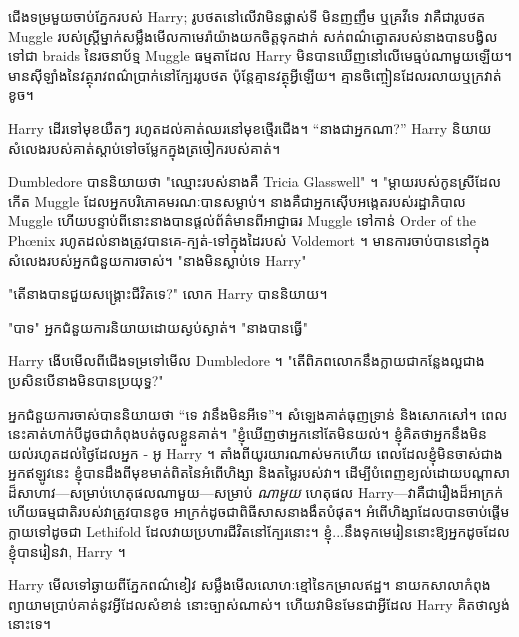 {ជើង​ទម្រ​មួយ​ចាប់​ភ្នែក​របស់ Harry; រូបថតនៅលើវាមិនផ្លាស់ទី មិនញញឹម ឬគ្រវីទេ វាគឺជារូបថត Muggle របស់ស្ត្រីម្នាក់សម្លឹងមើលកាមេរ៉ាយ៉ាងយកចិត្តទុកដាក់ សក់ពណ៌ត្នោតរបស់នាងបានបង្វិលទៅជា braids នៃរចនាប័ទ្ម Muggle ធម្មតាដែល Harry មិនបានឃើញនៅលើមេធ្មប់ណាមួយឡើយ។ មានស៊ីឡាំងនៃវត្ថុរាវពណ៌ប្រាក់នៅក្បែររូបថត ប៉ុន្តែគ្មានវត្ថុអ្វីឡើយ។ គ្មាន​ចិញ្ចៀន​ដែល​រលាយ​ឬ​ក្រវាត់​ខូច។

Harry ដើរទៅមុខយឺតៗ រហូតដល់គាត់ឈរនៅមុខថ្មើរជើង។ “នាងជាអ្នកណា?” Harry និយាយ សំលេងរបស់គាត់ស្តាប់ទៅចម្លែកក្នុងត្រចៀករបស់គាត់។

Dumbledore បាននិយាយថា "ឈ្មោះរបស់នាងគឺ Tricia Glasswell" ។ "ម្តាយរបស់កូនស្រីដែលកើត Muggle ដែលអ្នកបរិភោគមរណៈបានសម្លាប់។ នាងគឺជាអ្នកស៊ើបអង្កេតរបស់រដ្ឋាភិបាល Muggle ហើយបន្ទាប់ពីនោះនាងបានផ្តល់ព័ត៌មានពីអាជ្ញាធរ Muggle ទៅកាន់ Order of the Phœnix រហូតដល់នាងត្រូវបានគេ-ក្បត់-ទៅក្នុងដៃរបស់ Voldemort ។ មានការចាប់បាននៅក្នុងសំលេងរបស់អ្នកជំនួយការចាស់។ "នាងមិនស្លាប់ទេ Harry"

"តើនាងបានជួយសង្គ្រោះជីវិតទេ?" លោក Harry បាននិយាយ។

"បាទ" អ្នកជំនួយការនិយាយដោយស្ងប់ស្ងាត់។ "នាងបានធ្វើ"

Harry ងើប​មើល​ពី​ជើង​ទម្រ​ទៅ​មើល Dumbledore ។ "តើពិភពលោកនឹងក្លាយជាកន្លែងល្អជាងប្រសិនបើនាងមិនបានប្រយុទ្ធ?"

អ្នកជំនួយការចាស់បាននិយាយថា “ទេ វានឹងមិនអីទេ”។ សំឡេង​គាត់​ធុញ​ទ្រាន់ និង​សោកសៅ។ ពេលនេះគាត់ហាក់បីដូចជាកំពុងបត់ចូលខ្លួនគាត់។ "ខ្ញុំឃើញថាអ្នកនៅតែមិនយល់។ ខ្ញុំគិតថាអ្នកនឹងមិនយល់រហូតដល់ថ្ងៃដែលអ្នក - អូ Harry ។ តាំងពីយូរយារណាស់មកហើយ ពេលដែលខ្ញុំមិនចាស់ជាងអ្នកឥឡូវនេះ ខ្ញុំបានដឹងពីមុខមាត់ពិតនៃអំពើហិង្សា និងតម្លៃរបស់វា។ ដើម្បីបំពេញខ្យល់ដោយបណ្តាសាដ៏សាហាវ—សម្រាប់ហេតុផលណាមួយ—សម្រាប់ \emph{ណាមួយ} ហេតុផល Harry—វាគឺជារឿងដ៏អាក្រក់ ហើយធម្មជាតិរបស់វាត្រូវបានខូច អាក្រក់ដូចជាពិធីសាសនាងងឹតបំផុត។ អំពើ​ហិង្សា​ដែល​បាន​ចាប់​ផ្ដើម​ក្លាយ​ទៅ​ដូច​ជា Lethifold ដែល​វាយ​ប្រហារ​ជីវិត​នៅ​ក្បែរ​នោះ។ ខ្ញុំ...នឹងទុកមេរៀននោះឱ្យអ្នកដូចដែលខ្ញុំបានរៀនវា, Harry ។

Harry មើលទៅឆ្ងាយពីភ្នែកពណ៌ខៀវ សម្លឹងមើលលោហៈខ្មៅនៃកម្រាលឥដ្ឋ។ នាយកសាលាកំពុងព្យាយាមប្រាប់គាត់នូវអ្វីដែលសំខាន់ នោះច្បាស់ណាស់។ ហើយវាមិនមែនជាអ្វីដែល Harry គិតថាល្ងង់នោះទេ។

}
